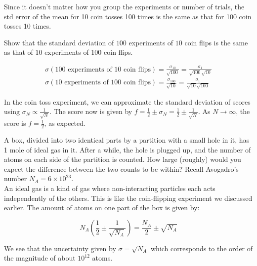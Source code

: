 Since it doesn’t matter how you group the experiments or number of trials, the std error of the mean for 10 coin tosses 100 times is the same as that for 100 coin tosses 10 times.

\begin{texample}
	Show that the standard deviation of $100$ experiments of $10$ coin flips is the same as that of $10$ experiments of $100$ coin flips.
	
	\begin{align*}
		\sigma (\text{$100$ experiments of $10$ coin flips}) = \frac{\sigma_{10}}{\sqrt{100}}=\frac{\sigma_1}{\sqrt{100}\sqrt{10}} \\
		\sigma (\text{$10$ experiments of $100$ coin flips}) = \frac{\sigma_{100}}{\sqrt{10}}=\frac{\sigma_1}{\sqrt{10}\sqrt{100}}
	\end{align*}
\end{texample}

In the coin toss experiment, we can approximate the standard deviation of scores using $\sigma_N \propto \frac{1}{\sqrt{N}}$. The score now is given by $f=\frac{1}{2} \pm \sigma_N = \frac{1}{2} \pm \frac{1}{\sqrt{N}}$. As $N\to\infty$, the score is $f=\frac{1}{2}$, as expected.

\begin{texample}
	A box, divided into two identical parts by a partition with a small hole in it, has 1 mole of ideal gas in it. After a while, the hole is plugged up, and the number of atoms on each side of the partition is counted. How large (roughly) would you expect the difference between the two counts to be within? Recall Avogadro's number $N_A=6\times10^{23}$. \\
	
	An ideal gas is a kind of gas where non-interacting particles each acts independently of the others. This is like the coin-flipping experiment we discussed earlier. The amount of atoms on one part of the box is given by:
	
	$$N_A \left(\frac{1}{2} \pm \frac{1}{\sqrt{N_A}}\right) = \frac{N_A}{2} \pm \sqrt{N_A}$$
	
	We see that the uncertainty given by $\sigma=\sqrt{N_A}$ which corresponds to the order of the magnitude of about $10^{12}$ atoms.
\end{texample}
